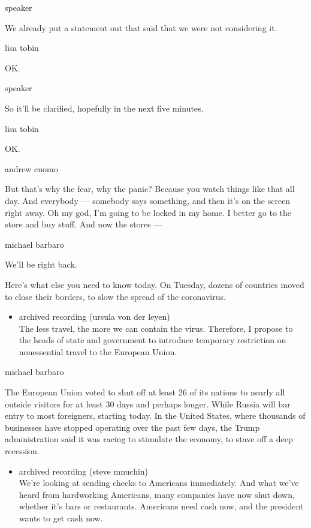 speaker

We already put a statement out that said that we were not considering
it.

lisa tobin

OK.

speaker

So it'll be clarified, hopefully in the next five minutes.

lisa tobin

OK.

andrew cuomo

But that's why the fear, why the panic? Because you watch things like
that all day. And everybody --- somebody says something, and then it's
on the screen right away. Oh my god, I'm going to be locked in my home.
I better go to the store and buy stuff. And now the stores ---

michael barbaro

We'll be right back.

Here's what else you need to know today. On Tuesday, dozens of countries
moved to close their borders, to slow the spread of the coronavirus.

\begin{itemize}
\tightlist
\item
  archived recording (ursula von der leyen)\\
  The less travel, the more we can contain the virus. Therefore, I
  propose to the heads of state and government to introduce temporary
  restriction on nonessential travel to the European Union.
\end{itemize}

michael barbaro

The European Union voted to shut off at least 26 of its nations to
nearly all outside visitors for at least 30 days and perhaps longer.
While Russia will bar entry to most foreigners, starting today. In the
United States, where thousands of businesses have stopped operating over
the past few days, the Trump administration said it was racing to
stimulate the economy, to stave off a deep recession.

\begin{itemize}
\tightlist
\item
  archived recording (steve mnuchin)\\
  We're looking at sending checks to Americans immediately. And what
  we've heard from hardworking Americans, many companies have now shut
  down, whether it's bars or restaurants. Americans need cash now, and
  the president wants to get cash now.
\end{itemize}

